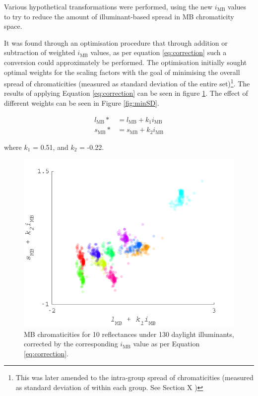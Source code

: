 Various hypothetical transformations were performed, using the new $i_{\text{MB}}$ values to try to reduce the amount of illuminant-based spread in \gls{MB} chromaticity space.

It was found through an optimisation procedure that through addition or subtraction of weighted $i_{\text{MB}}$ values, as per equation \ref{eq:correction} such a conversion could approximately be performed. The optimisation initially sought optimal weights for the scaling factors with the goal of minimising the overall spread of chromaticities (measured as standard deviation of the entire set)\footnote{This was later amended to the intra-group spread of chromaticities (measured as standard deviation of within each group. See Section X%
)}. The results of applying Equation \ref{eq:correction} can be seen in figure \ref{fig:corrected}. The effect of different weights can be seen in Figure \ref{fig:minSD}. 

\begin{subequations} \label{eq:correction}
\begin{align}
l_{\text{MB}}* &= l_{\text{MB}} + k_{1}i_{\text{MB}}\\ %
s_{\text{MB}}* &= s_{\text{MB}} + k_{2}i_{\text{MB}}
\end{align}
\end{subequations}

where $k_{1}$ = 0.51, and $k_{2}$ = -0.22.

\begin{figure}[htbp]
    \includegraphics[max width=\textwidth]{figs/comp/transformToIllIndSpace/correctedChromaticities.pdf}
    \caption{\gls{MB} chromaticities for 10 reflectances under 130 daylight illuminants, corrected by the corresponding $i_{\text{MB}}$ value as per Equation \ref{eq:correction}.}
    \label{fig:corrected}
\end{figure} 

